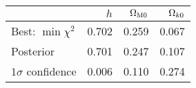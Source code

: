 \begin{tabular}{l|rrr}
      & $h$ & $\Omega_\mathrm{M0}$ & $\Omega_{k0}$  \\
    \hline
    Best: $\min{\chi^2}$  & 0.702 & 0.259 & 0.067  \\
    Posterior  & 0.701 & 0.247 & 0.107   \\
    $1\sigma$ confidence  & 0.006 & 0.110 & 0.274 \\ 
    \hline
    \hline
\end{tabular}